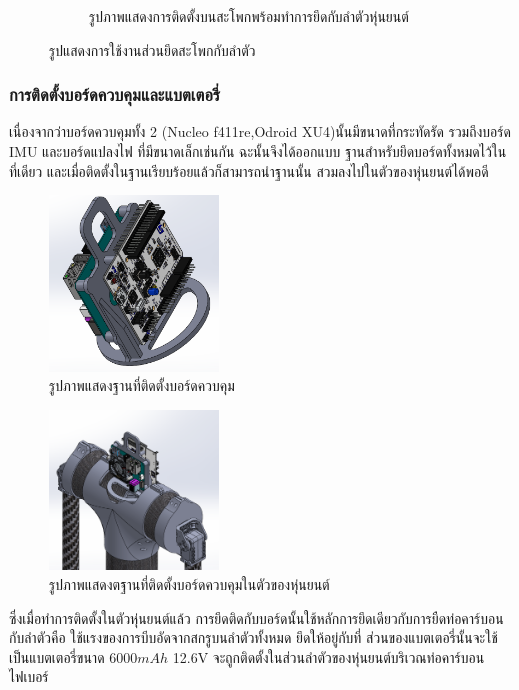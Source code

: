 \begin{figure}[h!]
\begin{subfigure}[b]{0.4\linewidth}
    \caption{รูปภาพแสดงการติดตั้งบนสะโพกพร้อมทำการยึดกับลำตัวหุ่นยนต์}
  \end{subfigure}
  \caption{รูปแสดงการใช้งานส่วนยึดสะโพกกับลำตัว}
  \label{fig:barefoot_compilation}
\end{figure}

\subsubsection*{การติดตั้งบอร์ดควบคุมและแบตเตอรี่}
เนื่องจากว่าบอร์ดควบคุมทั้ง 2 (Nucleo f411re,Odroid XU4)นั้นมีขนาดที่กระทัดรัด รวมถึงบอร์ด IMU และบอร์ดแปลงไฟ ที่มีขนาดเล็กเช่นกัน ฉะนั้นจึงได้ออกแบบ
ฐานสำหรับยึดบอร์ดทั้งหมดไว้ในที่เดียว และเมื่อติดตั้งในฐานเรียบร้อยแล้วก็สามารถนำฐานนั้น สวมลงไปในตัวของหุ่นยนต์ได้พอดี
\begin{figure}[h!]
  \centering
  \includegraphics[width=0.4\textwidth]{chapter4/images/board_hold.PNG}
  \caption{รูปภาพแสดงฐานที่ติดตั้งบอร์ดควบคุม}
  \label{fig:board_hold}
\end{figure}
 
\clearpage
\begin{figure}[h!]
  \centering
  \includegraphics[width=0.4\textwidth]{chapter4/images/install_board.PNG}
  \caption{รูปภาพแสดงตฐานที่ติดตั้งบอร์ดควบคุมในตัวของหุ่นยนต์}
  \label{fig:install_board}
\end{figure}

ซึ่งเมื่อทำการติดตั้งในตัวหุ่นยนต์แล้ว การยึดติดกับบอร์ดนั้นใช้หลักการยึดเดียวกับการยืดท่อคาร์บอนกับลำตัวคือ
ใช้แรงของการบีบอัดจากสกรูบนลำตัวทั้งหมด ยึดให้อยู่กับที่ ส่วนของแบตเตอรี่นั้นจะใช้เป็นแบตเตอรี่ขนาด 6000$mAh$ 12.6V
จะถูกติดตั้งในส่วนลำตัวของหุ่นยนต์บริเวณท่อคาร์บอนไฟเบอร์

